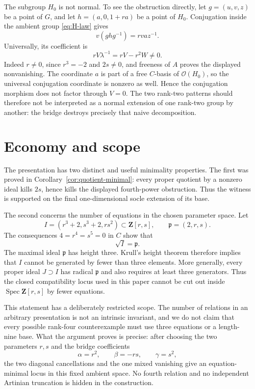 \documentclass[11pt]{amsart}
\theoremstyle{definition}
\theoremstyle{remark}
\newcommand{\Z}{\mathbf Z}
\newcommand{\Spec}{\operatorname{Spec}}
\begin{document}
The subgroup \(H_0\) is not normal.  To see the obstruction directly, let
\(g=(u,v,z)\) be a point of \(G\), and let
\(h=(a,0,1+ra)\) be a point of \(H_0\).  Conjugation inside the ambient
group \eqref{eq:H-law} gives
\begin{equation}\label{eq:conjugation}
 v(ghg^{-1})=rva z^{-1}.
\end{equation}
Universally, its coefficient is
\[
 rV\lambda^{-1}=rV-r^2W\ne0.
\]
Indeed \(r\ne0\), since \(r^3=-2\) and \(2s\ne0\), and freeness of \(A\)
proves the displayed nonvanishing.  The coordinate \(a\) is part of a free
\(C\)-basis of \(\mathcal O(H_0)\), so the universal conjugation coordinate
is nonzero as well.
Hence the conjugation morphism does not factor through \(V=0\).  The two
rank-two patterns should therefore not be interpreted as a normal
extension of one rank-two group by another: the bridge destroys precisely
that naive decomposition.

\section{Economy and scope}\label{sec:economy}

The presentation has two distinct and useful minimality properties.  The
first was proved in Corollary~\ref{cor:quotient-minimal}: every proper
quotient by a nonzero ideal kills \(2s\), hence kills the displayed
fourth-power obstruction.  Thus the witness is supported on the final
one-dimensional socle extension of its base.

The second concerns the number of equations in the chosen parameter
space.  Let
\[
 I=(r^3+2,s^3+2,rs^2)\subset\Z[r,s],
 \qquad
 \mathfrak p=(2,r,s).
\]
The consequences \(4=r^4=s^5=0\) in \(C\) show that
\[
 \sqrt I=\mathfrak p.
\]
The maximal ideal \(\mathfrak p\) has height three.  Krull's height theorem
therefore implies that \(I\) cannot be generated by fewer than three
elements.  More generally, every proper ideal \(J\supset I\) has radical
\(\mathfrak p\) and also requires at least three generators.  Thus the
closed compatibility locus used in this paper cannot be cut out inside
\(\Spec\Z[r,s]\) by fewer equations.

This statement has a deliberately restricted scope.  The number of
relations in an arbitrary presentation is not an intrinsic invariant, and
we do not claim that every possible rank-four counterexample must use
three equations or a length-nine base.  What the argument proves is
precise: after choosing the two parameters \(r,s\) and the bridge
coefficients
\[
 \alpha=r^2,
 \qquad \beta=-rs,
 \qquad \gamma=s^2,
\]
the two diagonal cancellations and the one mixed vanishing give an
equation-minimal locus in this fixed ambient space.  No fourth relation and
no independent Artinian truncation is hidden in the construction.
\end{document}
